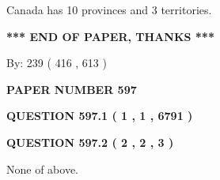 \documentclass[12pt]{article}
\begin{document}
  
 
 
\noindent{}
 
 
Canada has 10  provinces and 3 territories.
 
 
 
 
   
   
 \vspace{0.2in}
 
   
   
   
   
\vspace{1.0in} 
{\textbf{\large{ *** END OF PAPER, THANKS *** }}} 
   
   
\hspace{1.0in} By: 
 239 ( 416 ,  613 )
   
   
   
   
\newpage 
\setcounter{page}{ 
   597001 } 
   
   
   
   
 {\textbf{ \Large{ PAPER NUMBER  597  }}}
   
   
\vspace{0.2in}
   
   
   
   
   
   
 \vspace{0.2in}
 
 
 
 
   
   
  
\vspace{0.2in}
  
{\textbf{\Large{QUESTION
597.1 
 ( 1 , 1 , 6791 )
}}}
  
  
  
\vspace{0.2in}
  
{\textbf{\Large{QUESTION
597.2 
 ( 2 , 2 , 3 )
}}}
  
  
 
 
\noindent{}
 
 
 None of above.
 
 
 
 
   
   
 \vspace{0.2in}
 
\end{document}
